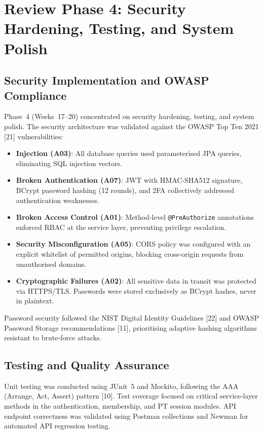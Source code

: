 \documentclass[
  12pt,
  a4paperpaper,
]{report}
\providecommand{\tightlist}{%
  \setlength{\itemsep}{0pt}\setlength{\parskip}{0pt}\setlength{\topsep}{2pt}\setlength{\partopsep}{0pt}}
\begin{document}
\section{Review Phase 4: Security Hardening, Testing, and System
Polish}\label{review-phase-4}

\subsection{Security Implementation and OWASP
Compliance}\label{security-owasp}

Phase~4 (Weeks~17--20) concentrated on security hardening, testing,
and system polish. The security architecture was validated against
the OWASP Top Ten 2021 {[}21{]} vulnerabilities:

\begin{itemize}
\tightlist
\item \textbf{Injection (A03)}: All database queries used
  parameterised JPA queries, eliminating SQL injection vectors.
\item \textbf{Broken Authentication (A07)}: JWT with HMAC-SHA512
  signature, BCrypt password hashing (12 rounds), and 2FA
  collectively addressed authentication weaknesses.
\item \textbf{Broken Access Control (A01)}: Method-level
  \texttt{@PreAuthorize} annotations enforced RBAC at the service
  layer, preventing privilege escalation.
\item \textbf{Security Misconfiguration (A05)}: CORS policy was
  configured with an explicit whitelist of permitted origins,
  blocking cross-origin requests from unauthorised domains.
\item \textbf{Cryptographic Failures (A02)}: All sensitive data in
  transit was protected via HTTPS/TLS. Passwords were stored
  exclusively as BCrypt hashes, never in plaintext.
\end{itemize}

Password security followed the NIST Digital Identity Guidelines
{[}22{]} and OWASP Password Storage recommendations
{[}11{]}, prioritising adaptive hashing algorithms
resistant to brute-force attacks.

\subsection{Testing and Quality
Assurance}\label{testing-qas}

Unit testing was conducted using JUnit~5 and Mockito, following the
AAA (Arrange, Act, Assert) pattern {[}10{]}. Test coverage
focused on critical service-layer methods in the authentication,
membership, and PT session modules. API endpoint correctness was
validated using Postman collections and Newman for automated API
regression testing.
\end{document}
